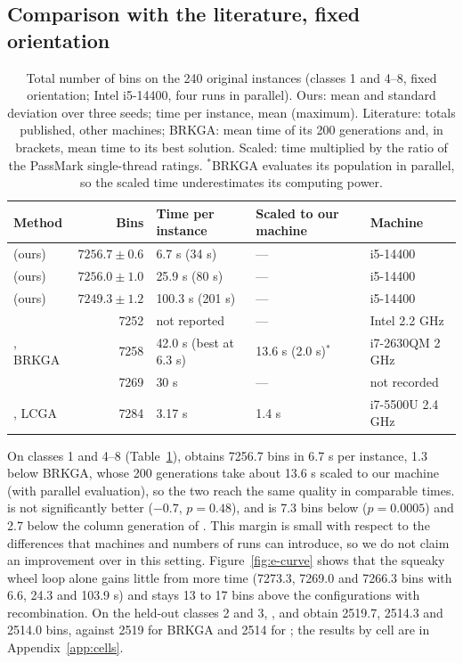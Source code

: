 \subsection{Comparison with the literature, fixed orientation}
\label{sec:e-mpv}

\begin{table}[t]
\centering
\small\setlength{\tabcolsep}{4pt}
\caption{Total number of bins on the 240 original instances (classes 1 and 4--8, fixed orientation; Intel i5-14400, four runs in parallel). Ours: mean and
standard deviation over three seeds; time per instance, mean (maximum). Literature: totals published, other machines;
BRKGA: mean time of its 200 generations and, in brackets, mean time to its best solution. Scaled: time multiplied by the
ratio of the PassMark single-thread ratings. $^\ast$BRKGA evaluates its population in parallel, so the scaled time
underestimates its computing power.}
\label{tab:e-main}
\begin{tabular}{@{}lrlll@{}}
\toprule
Method & Bins & Time per instance & Scaled to our machine & Machine\\
\midrule
\cfgfast{} (ours) & $7256.7\pm 0.6$ & 6.7 s (34 s) & --- & i5-14400\\
\cfgbal{} (ours) & $7256.0\pm 1.0$ & 25.9 s (80 s) & --- & i5-14400\\
\cfgqual{} (ours) & $7249.3\pm 1.2$ & 100.3 s (201 s) & --- & i5-14400\\
\midrule
\citet{Mahvash2018} & 7252 & not reported & --- & Intel 2.2 GHz\\
\citet{Goncalves2013}, BRKGA & 7258 & 42.0 s (best at 6.3 s) & 13.6 s (2.0 s)$^\ast$ & i7-2630QM 2 GHz\\
\citet{Zhu2012SD} & 7269 & 30 s & --- & not recorded\\
\citet{Elhedhli2019}, LCGA & 7284 & 3.17 s & 1.4 s & i7-5500U 2.4 GHz\\
\bottomrule
\end{tabular}
\end{table}

On classes 1 and 4--8 (Table~\ref{tab:e-main}), \cfgfast{} obtains 7256.7 bins in 6.7 s per instance, 1.3 below BRKGA,
whose 200 generations take about 13.6 s scaled to our machine (with parallel evaluation), so the two reach the same
quality in comparable times. \cfgbal{} is not significantly better ($-0.7$, $p=0.48$), and
\cfgqual{} is 7.3 bins below \cfgfast{} ($p=0.0005$) and 2.7 below the column generation of \citet{Mahvash2018}. This
margin is small with respect to the differences that machines and numbers of runs can introduce, so we do not claim an
improvement over \citet{Mahvash2018} in this setting. Figure~\ref{fig:e-curve} shows that the squeaky wheel loop alone
gains little from more time (7273.3, 7269.0 and 7266.3 bins with 6.6, 24.3 and 103.9 s) and stays 13 to 17 bins above
the configurations with recombination. On the held-out classes 2 and 3, \cfgfast{}, \cfgbal{} and \cfgqual{} obtain
2519.7, 2514.3 and 2514.0 bins, against 2519 for BRKGA and 2514 for \citet{Mahvash2018}; the results by cell are in
Appendix~\ref{app:cells}.

